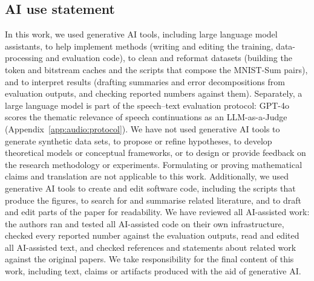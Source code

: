 \subsection*{AI use statement}

In this work, we used generative AI tools, including large language model assistants, to help
implement methods (writing and editing the training, data-processing and evaluation code), to clean
and reformat datasets (building the token and bitstream caches and the scripts that compose the
MNIST-Sum pairs), and to interpret results (drafting summaries and error decompositions from
evaluation outputs, and checking reported numbers against them). Separately, a large language model
is part of the speech--text evaluation protocol: GPT-4o scores the thematic relevance of speech
continuations as an LLM-as-a-Judge (Appendix~\ref{app:audio:protocol}). We have not used generative
AI tools to generate synthetic data sets, to propose or refine hypotheses, to develop theoretical
models or conceptual frameworks, or to design or provide feedback on the research methodology or
experiments. Formulating or proving mathematical claims and translation are not applicable to this
work. Additionally, we used generative AI tools to create and edit software code, including the
scripts that produce the figures, to search for and summarise related literature, and to draft and
edit parts of the paper for readability. We have reviewed all AI-assisted work: the authors ran and
tested all AI-assisted code on their own infrastructure, checked every reported number against the
evaluation outputs, read and edited all AI-assisted text, and checked references and statements about
related work against the original papers. We take responsibility for the final content of this work,
including text, claims or artifacts produced with the aid of generative AI.
